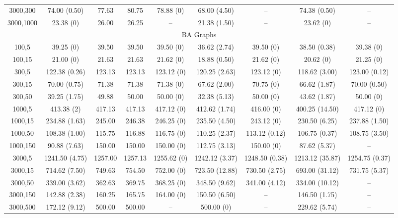 \begin{table*}[htbp]
\begin{adjustbox}{width=\textwidth}
\begin{tabular}{|c|ccc|cc|ccc|}
3000,300  & 74.00 (0.50)  & 77.63 & 80.75 & 78.88 (0) & 68.00 (4.50) & -- & 74.38 (0.50) & -- \\
3000,1000 & 23.38 (0)     & 26.00 & 26.25 & -- & 21.38 (1.50) & -- & 23.62 (0) & -- \\
\midrule
\multicolumn{9}{|c|}{BA Graphs} \\
\midrule
100,5     & 39.25 (0) & 39.50 & 39.50 & 39.50 (0) & 36.62 (2.74) & 39.50 (0) & 38.50 (0.38) & 39.38 (0) \\
100,15    & 21.00 (0) & 21.63 & 21.63 & 21.62 (0) & 18.88 (0.50) & 21.62 (0) & 20.62 (0) & 21.25 (0) \\
300,5     & 122.38 (0.26) & 123.13 & 123.13 & 123.12 (0) & 120.25 (2.63) & 123.12 (0) & 118.62 (3.00) & 123.00 (0.12) \\
300,15    & 70.00 (0.75) & 71.38 & 71.38 & 71.38 (0) & 67.62 (2.00) & 70.75 (0) & 66.62 (1.87) & 70.00 (0.50) \\
300,50    & 39.25 (1.75) & 49.88 & 50.00 & 50.00 (0) & 32.38 (5.13) & 50.00 (0) & 43.62 (1.87) & 50.00 (0) \\
1000,5    & 413.38 (2) & 417.13 & 417.13 & 417.12 (0) & 412.62 (1.74) & 416.00 (0) & 400.25 (14.50) & 417.12 (0) \\
1000,15   & 234.88 (1.63) & 245.00 & 246.38 & 246.25 (0) & 235.50 (4.50) & 243.12 (0) & 230.50 (6.25) & 237.88 (1.50) \\
1000,50   & 108.38 (1.00) & 115.75 & 116.88 & 116.75 (0) & 110.25 (2.37) & 113.12 (0.12) & 106.75 (0.37) & 108.75 (3.50) \\
1000,150  & 90.88 (7.63) & 150.00 & 150.00 & 150.00 (0) & 112.75 (3.13) & 150.00 (0) & 87.62 (5.37) & -- \\
3000,5    & 1241.50 (4.75) & 1257.00 & 1257.13 & 1255.62 (0) & 1242.12 (3.37) & 1248.50 (0.38) & 1213.12 (35.87) & 1254.75 (0.37) \\
3000,15   & 714.62 (7.50) & 749.63 & 754.50 & 752.00 (0) & 723.50 (12.88) & 730.50 (2.75) & 693.00 (31.12) & 731.75 (5.37) \\
3000,50   & 339.00 (3.62) & 362.63 & 369.75 & 368.25 (0) & 348.50 (9.62) & 341.00 (4.12) & 334.00 (10.12) & -- \\
3000,150  & 142.88 (2.38) & 160.25 & 165.75 & 164.00 (0) & 150.50 (6.50) & -- & 146.50 (1.75) & -- \\
3000,500  & 172.12 (9.12) & 500.00 & 500.00 & -- & 500.00 (0) & -- & 229.62 (5.74) & -- \\
\bottomrule
\end{tabular}
\end{adjustbox}
\end{table*}
